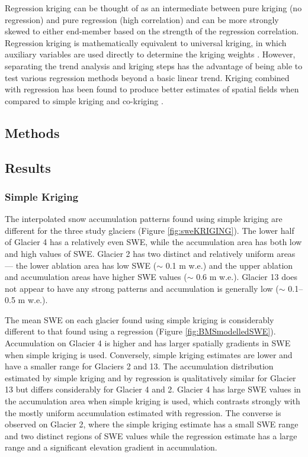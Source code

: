 \documentclass[12pt]{article}
\begin{document}
Regression kriging can be thought of as an intermediate between pure kriging (no regression) and pure regression (high correlation) and can be more strongly skewed to either end-member based on the strength of the regression correlation. Regression kriging is mathematically equivalent to universal kriging, in which auxiliary variables are used directly to determine the kriging weights \citep{Hengl2007}. However, separating the trend analysis and kriging steps has the advantage of being able to test various regression methods beyond a basic linear trend. Kriging combined with regression has been found to produce better estimates of spatial fields when compared to simple kriging and co-kriging \citep{Knotters1995}.

\subsection{Methods}

\subsection{Results}

\subsubsection{Simple Kriging}

The interpolated snow accumulation patterns found using simple kriging are different for the three study glaciers  (Figure \ref{fig:sweKRIGING}). The lower half of Glacier 4 has a relatively even SWE, while the accumulation area has both low and high values of SWE. Glacier 2 has two distinct and relatively uniform areas --- the lower ablation area has low SWE ($\sim$ 0.1 m w.e.) and the upper ablation and accumulation areas have higher SWE values ($\sim$ 0.6 m w.e.). Glacier 13 does not appear to have any strong patterns and accumulation is generally low ($\sim$ 0.1--0.5 m w.e.). 

The mean SWE on each glacier found using simple kriging is considerably different to that found using a regression (Figure \ref{fig:BMSmodelledSWE}). Accumulation on Glacier 4 is higher and has larger spatially gradients in SWE when simple kriging is used. Conversely, simple kriging estimates are lower and have a smaller range for Glaciers 2 and 13.  The accumulation distribution estimated by simple kriging and by regression is qualitatively similar for Glacier 13 but differs considerably for Glacier 4 and 2. Glacier 4 has large SWE values in the accumulation area when simple kriging is used, which contrasts strongly with the mostly uniform accumulation estimated with regression. The converse is observed on Glacier 2, where the simple kriging estimate has a small SWE range and two distinct regions of SWE values while the regression estimate has a large range and a significant elevation gradient in accumulation.
\end{document}
